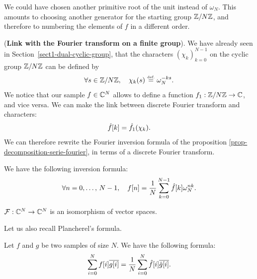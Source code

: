  
\begin{rem}
We could have chosen another primitive root of the unit instead of $ \omega_N $. This amounts to choosing another generator for the starting group $ \mathbb{Z}/N \mathbb{Z} $, and therefore to numbering the elements of $ f $ in a different order.
\end{rem}
 
 
\begin{rem}{(\upshape \textbf{Link with the Fourier transform on a finite group}).} 
 We have already seen in Section~\ref{sect1-dual-cyclic-group}, that the characters $ (\chi_k)_{k = 0}^{N-1 } $ on the cyclic group $ \mathbb{Z}/N \mathbb{Z} $ can be defined by
\begin{equation}
\label{eq-formula-character-znz}
\forall s \in \mathbb{Z}/N \mathbb{Z}, \quad \chi_k (s) \stackrel{\mbox{\upshape\tiny def.}}{=} \omega_N^{- ks}.
\end{equation}
We notice that our sample $ f \in \mathbb{C}^N $ allows to define a function $ f_1: \mathbb{Z}/N \mathbb{Z} \rightarrow \mathbb{C} $, and vice versa. We can make the link between discrete Fourier transform and characters:
\begin{equation*}
\hat{f}[k] = \hat{f_1} (\chi_k).
\end{equation*}
We can therefore rewrite the Fourier inversion formula of the proposition \ref{prop-decomposition-serie-fourier}, in terms of a discrete Fourier transform.
\end{rem}
 
 
\begin{prop}
\label{prop-tfd-inverse}
 We have the following inversion formula:
\begin{equation}
\label{eq-transforme-fourier-discr-inverse}
\forall n = 0, \ldots, \, N-1, \quad f[n] = \frac{1}{N} \sum_{k = 0}^{N-1}{\hat{f}[ k] \omega_N^{nk}}.
\end{equation}
\end{prop}
 
 
\begin{cor}
$ \mathcal{F}: \mathbb{C}^N \rightarrow \mathbb{C}^N $ is an isomorphism of vector spaces.
\end{cor}
Let us also recall Plancherel's formula.
 
\begin{prop}
\label{prop-formula-floorel-tfd}
 Let $ f $ and $ g $ be two samples of size $N$. We have the following formula:
\begin{equation*}
\sum_{i = 0}^N{f[i] \overline{g [i]}} = \frac{1}{N} \sum_{i = 0}^N{\hat{f}[i] \overline{\hat{g}[i]}}.
\end{equation*}
\end{prop}
 
